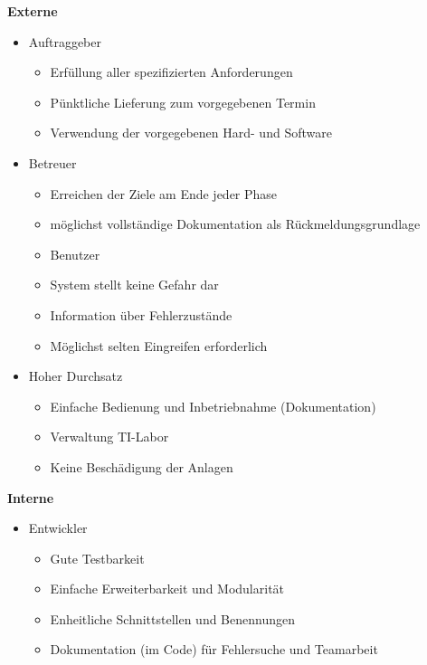 \textbf{Externe}
    \begin{itemize}
        \item Auftraggeber
        \begin{itemize}
            \item Erfüllung aller spezifizierten Anforderungen
            \item Pünktliche Lieferung zum vorgegebenen Termin
            \item Verwendung der vorgegebenen Hard- und Software
        \end{itemize}
        \item Betreuer
        \begin{itemize}
            \item Erreichen der Ziele am Ende jeder Phase
            \item möglichst vollständige Dokumentation als Rückmeldungsgrundlage
            \item Benutzer
        \end{itemize}
        \begin{itemize}
            \item System stellt keine Gefahr dar
            \item Information über Fehlerzustände
            \item Möglichst selten Eingreifen erforderlich
        \end{itemize}
        \item Hoher Durchsatz
        \begin{itemize}
            \item Einfache Bedienung und Inbetriebnahme (Dokumentation)
            \item Verwaltung TI-Labor
            \item Keine Beschädigung der Anlagen
        \end{itemize}
    \end{itemize}
\newline
\textbf{Interne}
    \begin{itemize}
        \item Entwickler
        \begin{itemize}
        \item Gute Testbarkeit
        \item Einfache Erweiterbarkeit und Modularität
        \item Enheitliche Schnittstellen und Benennungen
        \item Dokumentation (im Code) für Fehlersuche und Teamarbeit
        \end{itemize}
    \end{itemize}


